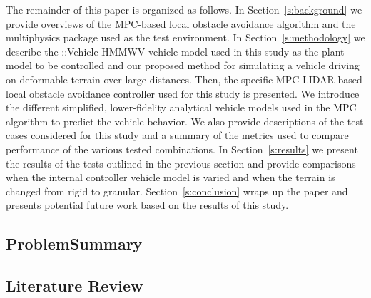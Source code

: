 \documentclass[12pt,onecolumn]{article}
\newcommand{\CHRONO}{{\sffamily{{Chrono}}}}
\newcommand{\ChronoVehicle}{{\sffamily{Chrono}}::Vehicle}
\begin{document}
The remainder of this paper is organized as follows.  In Section~\ref{s:background} we provide overviews of the MPC-based local obstacle avoidance algorithm and the {\CHRONO} multiphysics package used as the test environment. In Section~\ref{s:methodology} we describe the {\ChronoVehicle} HMMWV vehicle model used in this study as the plant model to be controlled and our proposed method for simulating a vehicle driving on deformable terrain over large distances. Then, the specific MPC LIDAR-based local obstacle avoidance controller used for this study is presented. We introduce the different simplified, lower-fidelity analytical vehicle models used in the MPC algorithm to predict the {\CHRONO} vehicle behavior. We also provide descriptions of the test cases considered for this study and a summary of the metrics used to compare performance of the various tested combinations. In Section~\ref{s:results} we present the results of the tests outlined in the previous section and provide comparisons when the internal controller vehicle model is varied and when the terrain is changed from rigid to granular. Section~\ref{s:conclusion} wraps up the paper and presents potential future work based on the results of this study.


\subsection{ProblemSummary}\label{ss:ProblemSummary}


\subsection{Literature Review}\label{ss:LiteratureReview}
\end{document}
